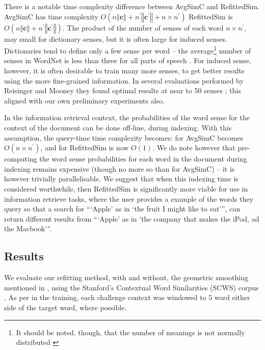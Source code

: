 \documentclass{sig-alternate}
\renewcommand{\c}{\mathbf{c}}
\begin{document}
There is a notable time complexity difference between AvgSimC and RefittedSim.
AvgSimC has time complexity $O(n\left\Vert \c\right\Vert +n^{\prime}\left\Vert \c^{\prime}\right\Vert +n\times n^{\prime})$
RefittedSim is $O(n\left\Vert \c\right\Vert +n^{\prime}\left\Vert \c^{\prime}\right\Vert)$.
The product of the number of senses of each word $n \times n^\prime$, may small for dictionary senses, but it is often large for induced senses. Dictionaries tend to define only a few sense per word -- the average\footnote{It should be noted, though, that the number of meanings is not normally distributed \parencite{zipf1945meaning}} number of senses in WordNet is less than three for all parts of speech \parencite{miller1995wordnet}. For induced sense, however, it is often desirable to train many more senses, to get better results using the more fine-grained information. In several evaluations performed by Reisinger and Mooney they found optimal results at near to 50 senses \parencite{Reisinger2010}; this aligned with our own preliminary experiments also.

In the information retrieval context, the probabilities of the word sense for the context of the document can be done off-line, during indexing. With this assumption, the query-time time complexity becomes: for AvgSimC becomes $O(n\times n^{\prime})$, and for RefittedSim is now $O(1)$.
We do note however that pre-computing the word sense probabilities for each word in the document during indexing remains expensive (though no more so than for AvgSimC) -- it is however trivially parallelisable. We suggest that when this indexing time is considered worthwhile, then RefittedSim is significantly more viable for use in information retrieve tasks, where the user provides a example of the words they query so that a search for \enquote{\enquote{Apple} as in \enquote{the fruit I might like to eat}}, can return different results from \enquote{\enquote{Apple} as in \enquote{the company that makes the iPod, ad the Macbook}}.



\subsection{Results}
We evaluate our refitting method, with and without, the geometric smoothing mentioned in , using the Stanford's Contextual Word Similarities (SCWS) corpus \parencite{Huang2012}.
As per in the training, each challenge context was windowed to 5 word either side of the target word, where possible.
\end{document}
